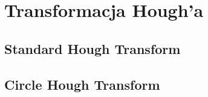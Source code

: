 \chapter{Transformacja Hough'a}
\label{sec:hough}

\section{Standard Hough Transform}

\section{Circle Hough Transform}

